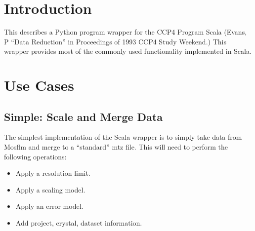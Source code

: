 \documentclass[a4paper, 11pt]{article}
\begin{document}
\section{Introduction}

This describes a Python program wrapper for the CCP4 Program Scala
(Evans, P ``Data Reduction'' in Proceedings of 1993 CCP4 Study Weekend.)
This wrapper provides most of the commonly used functionality implemented
in Scala.

\section{Use Cases}

\subsection{Simple: Scale and Merge Data}

The simplest implementation of the Scala wrapper is to simply take data 
from Mosflm and merge to a ``standard'' mtz file. This will need to perform
the following operations:

\begin{itemize}
\item{Apply a resolution limit.}
\item{Apply a scaling model.}
\item{Apply an error model.}
\item{Add project, crystal, dataset information.}
\end{itemize}
\end{document}

